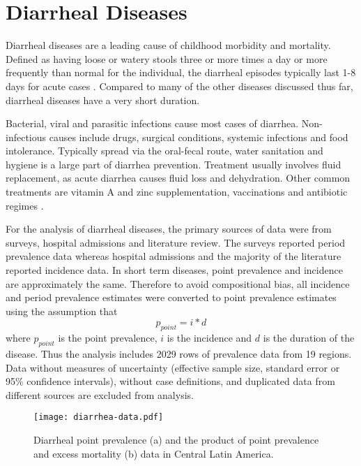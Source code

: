 \chapter{Diarrheal Diseases}
\label{applications-short_dur} 

Diarrheal diseases are a leading cause of childhood morbidity and mortality.  Defined as having loose or watery stools three or more times a day or more frequently than normal for the individual, the diarrheal episodes typically last 1-8 days for acute cases \cite{unicef_diarrhoea_2009, carlos_etiology_1990, lamberti_systematic_2012}.  Compared to many of the other diseases discussed thus far, diarrheal diseases have a very short duration.

Bacterial, viral and parasitic infections cause most cases of diarrhea.  Non-infectious causes include drugs, surgical conditions, systemic infections and food intolerance.  Typically spread via the oral-fecal route, water sanitation and hygiene is a large part of diarrhea prevention.  Treatment usually involves fluid replacement, as acute diarrhea causes fluid loss and dehydration.  Other common treatments are vitamin A and zinc supplementation, vaccinations and antibiotic regimes \cite{unicef_diarrhoea_2009, carlos_etiology_1990, lamberti_systematic_2012}.

For the analysis of diarrheal diseases, the primary sources of data were from surveys, hospital admissions and literature review.  The surveys reported period prevalence data whereas hospital admissions and the majority of the literature reported incidence data.  In short term diseases, point prevalence and incidence are approximately the same.  Therefore to avoid compositional bias, all incidence and period prevalence estimates were converted to point prevalence estimates using the assumption that
    \begin{equation}
    	p_{point}=i*d
    \end{equation}
where $p_{point}$ is the point prevalence, $i$ is the incidence and $d$ is the duration of the disease.  Thus the analysis includes 2029 rows of prevalence data from 19 regions.  Data without measures of uncertainty (effective sample size, standard error or 95\% confidence intervals), without case definitions, and duplicated data from different sources are excluded from analysis.

    \begin{figure}[h]
        \begin{center}
            \texttt{[image: diarrhea-data.pdf]}
            \caption{Diarrheal point prevalence (a) and the product of point prevalence and excess mortality (b) data in Central Latin America.}
            \label{fig:app-hepc regional rfx}
        \end{center}
    \end{figure}

